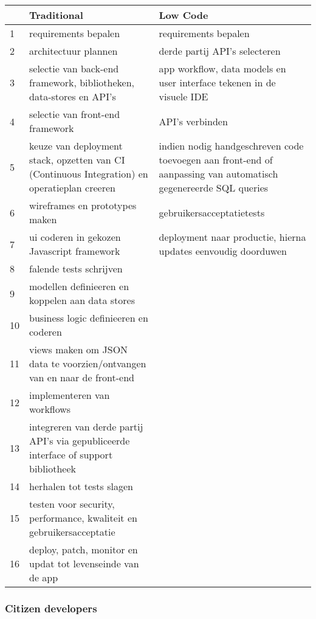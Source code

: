 \begin{landscape}
\begin{table}[]
    \begin{tabular}{@{}lll@{}}
        \toprule
        & \textbf{Traditional} & \textbf{Low Code} \\ \midrule
        1 & requirements bepalen & requirements bepalen \\
        2 & architectuur plannen & derde partij API's selecteren \\
        3 & selectie van back-end framework, bibliotheken, data-stores en API's & app workflow, data models en user interface tekenen in de visuele IDE \\
        4 & selectie van front-end framework & API's verbinden \\
        5 & keuze van deployment stack, opzetten van CI (Continuous Integration) en operatieplan creeren & indien nodig handgeschreven code toevoegen aan front-end of aanpassing van automatisch gegenereerde SQL queries \\
        6 & wireframes en prototypes maken & gebruikersacceptatietests \\
        7 & ui coderen in gekozen Javascript framework & deployment naar productie, hierna updates eenvoudig doorduwen \\
        8 & falende tests schrijven &  \\
        9 & modellen definieeren en koppelen aan data stores &  \\
        10 & business logic definieeren en coderen &  \\
        11 & views maken om JSON data te voorzien/ontvangen van en naar de front-end &  \\
        12 & implementeren van workflows &  \\
        13 & integreren van derde partij API's via gepubliceerde interface of support bibliotheek &  \\
        14 & herhalen tot tests slagen &  \\
        15 & testen voor security, performance, kwaliteit en gebruikersacceptatie &  \\
        16 & deploy, patch, monitor en updat tot levenseinde van de app &  \\ \bottomrule
    \end{tabular}
\end{table} \autocite{Revell2020}
\end{landscape} 

\subsubsection{Citizen developers}

